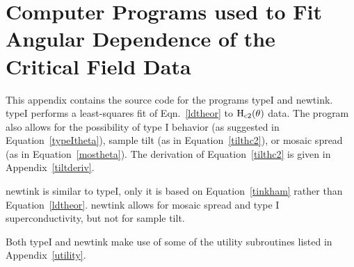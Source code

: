\chapter[Computer Programs used to Fit $\rm H_{c2}(\theta)$ Data]{Computer Programs used to Fit Angular Dependence of the Critical
Field Data}
\label{angprog}
\pagestyle{headings}

        This appendix contains the  source  code for the programs typeI and
newtink.  typeI performs a least-squares fit  of Eqn.~\ref{ldtheor} to $\rm
H_{c2}(\theta)$ data.  The program also allows for  the possibility of type
I behavior (as suggested in Equation~\ref{typeItheta}),  sample tilt (as in
Equation~\ref{tilthc2}), or mosaic spread (as in Equation~\ref{mostheta}).
The derivation of Equation~\ref{tilthc2} is given in Appendix~\ref{tiltderiv}.

        newtink  is     similar    to typeI,   only   it     is  based   on
Equation~\ref{tinkham} rather  than Equation~\ref{ldtheor}.  newtink allows
for mosaic spread and type I superconductivity, but not for sample tilt.

        Both typeI and newtink make use of some of the utility subroutines
listed in Appendix~\ref{utility}.

